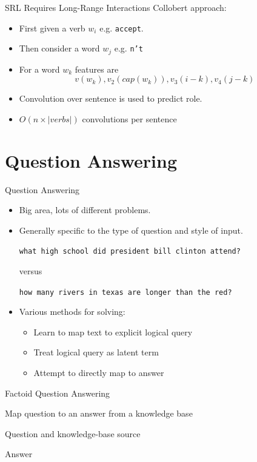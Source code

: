 \documentclass{beamer}
\begin{document}
\begin{frame}{SRL Requires Long-Range Interactions}
  Collobert approach:
  \begin{itemize}
  \item   First given a verb $w_i$ e.g. \texttt{accept}.
    \air 
  \item  Then consider a word $w_j$ e.g. \texttt{n't}
    \air
  \item  For a word $w_k$ features are 
    \[v(w_k), v_2(cap(w_k)), v_3(i-k), v_4(j-k)\]

    \air
  \item Convolution over sentence is used to predict role.
    \air 
  \item $O(n \times |verbs|)$ convolutions per sentence
  \end{itemize}
\end{frame}

\section{Question Answering}

\begin{frame}{Question Answering}
  \begin{itemize}
  \item Big area, lots of different problems.
    \air 
  \item Generally specific to the type of question and style of input. 
    \air 

    \texttt{what high school did president bill clinton attend?}
    
    versus 
    
    \texttt{how many rivers in texas are longer than the red?}
    \air 

  \item Various methods for solving:
    \begin{itemize}
    \item Learn to map text to explicit logical query
    \item Treat logical query as latent term 
    \item Attempt to directly map to answer  
    \end{itemize}
  \end{itemize}
\end{frame}

\begin{frame}{Factoid Question Answering}
  \begin{description} \itemsep 20pt
  \item[Goal]Map question to an answer from a  knowledge base 
  \item[Input] Question and knowledge-base source
  \item[Output] Answer
  \end{description}  
\end{frame}
\end{document}
